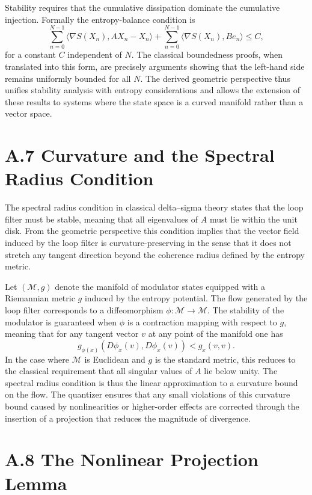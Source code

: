 Stability requires that the cumulative dissipation dominate the cumulative injection. Formally the entropy-balance condition is
\[
\sum_{n=0}^{N-1} \langle \nabla S(X_n), A X_n - X_n \rangle + \sum_{n=0}^{N-1} \langle \nabla S(X_n), B e_n \rangle \leq C,
\]
for a constant \(C\) independent of \(N\). The classical boundedness proofs, when translated into this form, are precisely arguments showing that the left-hand side remains uniformly bounded for all \(N\). The derived geometric perspective thus unifies stability analysis with entropy considerations and allows the extension of these results to systems where the state space is a curved manifold rather than a vector space.

\section{A.7 Curvature and the Spectral Radius Condition}

The spectral radius condition in classical delta–sigma theory states that the loop filter must be stable, meaning that all eigenvalues of \(A\) must lie within the unit disk. From the geometric perspective this condition implies that the vector field induced by the loop filter is curvature-preserving in the sense that it does not stretch any tangent direction beyond the coherence radius defined by the entropy metric.

Let \((\mathcal{M},g)\) denote the manifold of modulator states equipped with a Riemannian metric \(g\) induced by the entropy potential. The flow generated by the loop filter corresponds to a diffeomorphism \(\phi:\mathcal{M}\to\mathcal{M}\). The stability of the modulator is guaranteed when \(\phi\) is a contraction mapping with respect to \(g\), meaning that for any tangent vector \(v\) at any point of the manifold one has
\[
g_{\phi(x)}(D\phi_x(v),D\phi_x(v)) < g_x(v,v).
\]
In the case where \(\mathcal{M}\) is Euclidean and \(g\) is the standard metric, this reduces to the classical requirement that all singular values of \(A\) lie below unity. The spectral radius condition is thus the linear approximation to a curvature bound on the flow. The quantizer ensures that any small violations of this curvature bound caused by nonlinearities or higher-order effects are corrected through the insertion of a projection that reduces the magnitude of divergence.

\section{A.8 The Nonlinear Projection Lemma}


